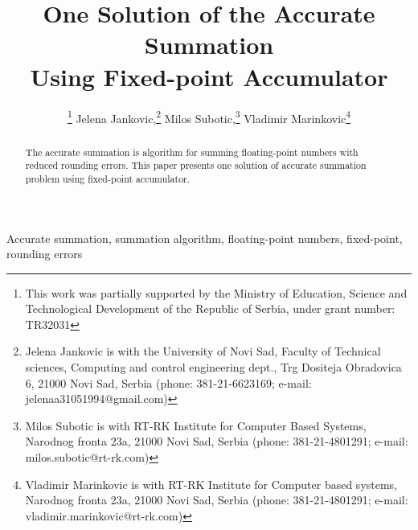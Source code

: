 \documentclass[conference]{IEEEtran}
\begin{document}
%
\title{One Solution of the Accurate Summation \\ Using Fixed-point Accumulator}


\author{
	\thanks{
		This work was partially supported by the Ministry of Education, 
		Science and Technological Development of the Republic of Serbia, 
		under grant number: TR32031
	}
	Jelena Jankovic,\thanks{
		Jelena Jankovic is with the University of Novi Sad, Faculty of Technical sciences, 
		Computing and control engineering dept., 
		Trg Dositeja Obradovica 6, 21000 Novi Sad, Serbia
		(phone: 381-21-6623169; e-mail: jelenaa31051994@gmail.com)
	}
	Milos Subotic,\thanks{
		Milos Subotic is with RT-RK Institute for Computer Based Systems,
		Narodnog fronta 23a, 21000 Novi Sad, Serbia
		(phone: 381-21-4801291; e-mail: milos.subotic@rt-rk.com)
	}
	Vladimir Marinkovic\thanks{
		Vladimir Marinkovic is with RT-RK Institute for Computer based systems,
		Narodnog fronta 23a, 21000 Novi Sad, Serbia
		(phone: 381-21-4801291; e-mail: vladimir.marinkovic@rt-rk.com)
	}
}


\maketitle


\begin{abstract}
The accurate summation is algorithm for summing floating-point numbers with reduced rounding errors.
This paper presents one solution of accurate summation problem using fixed-point accumulator.
\end{abstract}

\begin{IEEEkeywords}
Accurate summation, summation algorithm, floating-point numbers, fixed-point, rounding errors
\end{IEEEkeywords}
\end{document}
